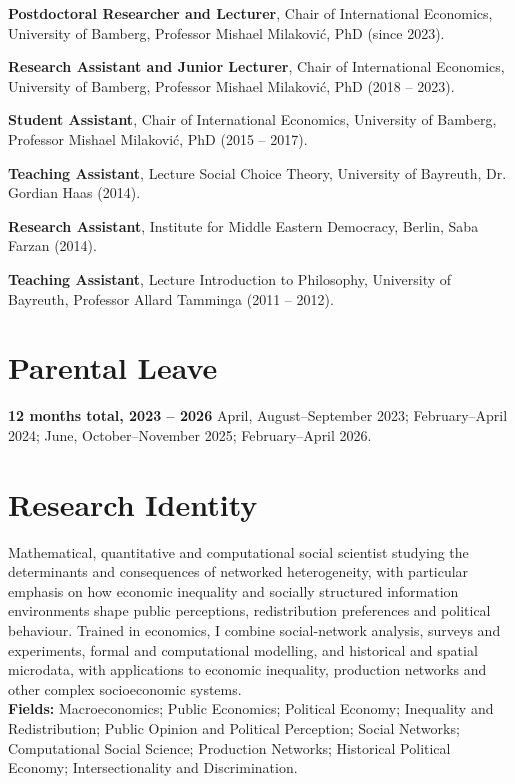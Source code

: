 \documentclass[margin]{res}
\begin{document}
\begin{resume}
	\textbf{Postdoctoral Researcher and Lecturer}, Chair of International Economics, University of Bamberg, Professor Mishael Milakovi\'c, PhD (since 2023).
	
	\textbf{Research Assistant and Junior Lecturer}, Chair of International Economics, University of Bamberg, Professor Mishael Milakovi\'c, PhD (2018 -- 2023).
	
	\textbf{Student Assistant}, Chair of International Economics, University of Bamberg, Professor Mishael Milakovi\'c, PhD (2015 -- 2017).

	\textbf{Teaching Assistant}, Lecture Social Choice Theory, University of Bayreuth, Dr. Gordian Haas (2014).
	
	\textbf{Research Assistant}, Institute for Middle Eastern Democracy, Berlin, Saba Farzan (2014).
	
	\textbf{Teaching Assistant}, Lecture Introduction to Philosophy, University of Bayreuth, Professor Allard Tamminga (2011 -- 2012).\\
	
	\enlargethispage{3\baselineskip}
	\section{Parental Leave}
	\textbf{12 months total, 2023 -- 2026} April, August--September 2023; February--April 2024; June, October--November 2025; February--April 2026.\\
	
	\section{Research Identity}
	Mathematical, quantitative and computational social scientist studying the determinants and consequences of networked heterogeneity, with particular emphasis on how economic inequality and socially structured information environments shape public perceptions, redistribution preferences and political behaviour. Trained in economics, I combine social-network analysis, surveys and experiments, formal and computational modelling, and historical and spatial microdata, with applications to economic inequality, production networks and other complex socioeconomic systems.\\
	
	\textbf{Fields:} Macroeconomics; Public Economics; Political Economy; Inequality and Redistribution; Public Opinion and Political Perception; Social Networks; Computational Social Science; Production Networks; Historical Political Economy; Intersectionality and Discrimination.\\
	

\end{resume}
\end{document}
